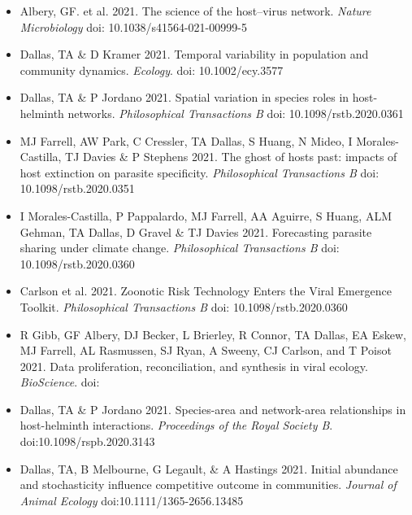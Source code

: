 \documentclass[]{CV}
\begin{document}
{}

\begin{itemize}

\item Albery, GF. et al. 2021. The science of the host–virus network. \textit{Nature Microbiology} doi: 10.1038/s41564-021-00999-5

\item {\mefont Dallas, TA} \& D Kramer 2021. Temporal variability in population and community dynamics. \textit{Ecology}. doi: 10.1002/ecy.3577

\item {\mefont Dallas, TA} \& P Jordano 2021. Spatial variation in species roles in host-helminth networks. \textit{Philosophical Transactions B} doi: 10.1098/rstb.2020.0361

\item MJ Farrell, AW Park, C Cressler, {\mefont TA Dallas}, S Huang, N Mideo, I Morales-Castilla, TJ Davies \& P Stephens 2021. The ghost of hosts past: impacts of host extinction on parasite specificity. \textit{Philosophical Transactions B} doi: 10.1098/rstb.2020.0351

\item I Morales-Castilla, P Pappalardo, MJ Farrell, AA Aguirre, S Huang, ALM Gehman, {\mefont TA Dallas}, D Gravel \& TJ Davies 2021. Forecasting parasite sharing under climate change. \textit{Philosophical Transactions B} doi: 10.1098/rstb.2020.0360

\item Carlson et al. 2021. Zoonotic Risk Technology Enters the Viral Emergence Toolkit. \textit{Philosophical Transactions B} doi: 10.1098/rstb.2020.0360

\item R Gibb, GF Albery, DJ Becker, L Brierley, R Connor, {\mefont TA Dallas}, EA Eskew, MJ Farrell, AL Rasmussen, SJ Ryan, A Sweeny, CJ Carlson, and T Poisot 2021. Data proliferation, reconciliation, and synthesis in viral ecology. \textit{BioScience}. doi: 

\item {\mefont Dallas, TA} \& P Jordano 2021. Species-area and network-area relationships in host-helminth interactions. \textit{Proceedings of the Royal Society B}. doi:10.1098/rspb.2020.3143

\item {\mefont Dallas, TA}, B Melbourne, G Legault, \& A Hastings 2021. Initial abundance and stochasticity influence competitive outcome in communities. \textit{Journal of Animal Ecology} doi:10.1111/1365-2656.13485


\end{itemize}
\end{document}
